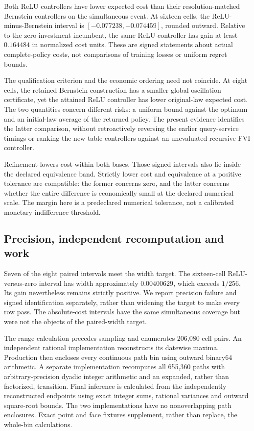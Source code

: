 


Both ReLU controllers have lower expected cost than their resolution-matched Bernstein controllers on the simultaneous event. At sixteen cells, the ReLU-minus-Bernstein interval is $[-0.077238,-0.074459]$, rounded outward. Relative to the zero-investment incumbent, the same ReLU controller has gain at least $0.164484$ in normalized cost units. These are signed statements about actual complete-policy costs, not comparisons of training losses or uniform regret bounds.

The qualification criterion and the economic ordering need not coincide. At eight cells, the retained Bernstein construction has a smaller global oscillation certificate, yet the attained ReLU controller has lower original-law expected cost. The two quantities concern different risks: a uniform bound against the optimum and an initial-law average of the returned policy. The present evidence identifies the latter comparison, without retroactively reversing the earlier query-service timings or ranking the new table controllers against an unevaluated recursive FVI controller.

Refinement lowers cost within both bases. Those signed intervals also lie inside the declared equivalence band. Strictly lower cost and equivalence at a positive tolerance are compatible: the former concerns zero, and the latter concerns whether the entire difference is economically small at the declared numerical scale. The margin here is a predeclared numerical tolerance, not a calibrated monetary indifference threshold.

\subsection{Precision, independent recomputation and work}
Seven of the eight paired intervals meet the width target. The sixteen-cell ReLU-versus-zero interval has width approximately $0.00400629$, which exceeds $1/256$. Its gain nevertheless remains strictly positive. We report precision failure and signed identification separately, rather than widening the target to make every row pass. The absolute-cost intervals have the same simultaneous coverage but were not the objects of the paired-width target.



The range calculation precedes sampling and enumerates 206,080 cell pairs. An independent rational implementation reconstructs its datewise maxima. Production then encloses every continuous path bin using outward binary64 arithmetic. A separate implementation recomputes all 655,360 paths with arbitrary-precision dyadic integer arithmetic and an expanded, rather than factorized, transition. Final inference is calculated from the independently reconstructed endpoints using exact integer sums, rational variances and outward square-root bounds. The two implementations have no nonoverlapping path enclosures. Exact point and face fixtures supplement, rather than replace, the whole-bin calculations.

